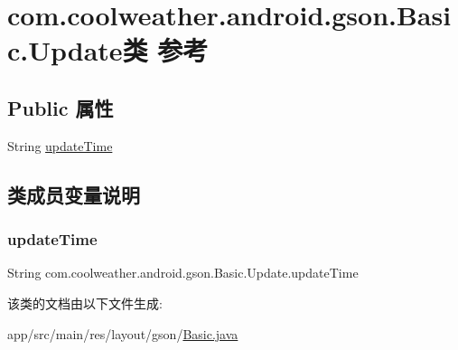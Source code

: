 \hypertarget{classcom_1_1coolweather_1_1android_1_1gson_1_1_basic_1_1_update}{}\section{com.\+coolweather.\+android.\+gson.\+Basic.\+Update类 参考}
\label{classcom_1_1coolweather_1_1android_1_1gson_1_1_basic_1_1_update}
\subsection*{Public 属性}
\begin{DoxyCompactItemize}
\item 
String \mbox{\hyperlink{classcom_1_1coolweather_1_1android_1_1gson_1_1_basic_1_1_update_ad8978d8c8fd3cf5dc62c99c1d34f65b7}{update\+Time}}
\end{DoxyCompactItemize}


\subsection{类成员变量说明}
\mbox{\label{classcom_1_1coolweather_1_1android_1_1gson_1_1_basic_1_1_update_ad8978d8c8fd3cf5dc62c99c1d34f65b7}} 
\subsubsection{\texorpdfstring{updateTime}{updateTime}}
{\footnotesize\ttfamily String com.\+coolweather.\+android.\+gson.\+Basic.\+Update.\+update\+Time}



该类的文档由以下文件生成\+:\begin{DoxyCompactItemize}
\item 
app/src/main/res/layout/gson/\mbox{\hyperlink{res_2layout_2gson_2_basic_8java}{Basic.\+java}}\end{DoxyCompactItemize}
